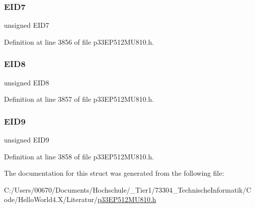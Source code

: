 \subsubsection{\texorpdfstring{E\+I\+D7}{EID7}}
{\footnotesize\ttfamily unsigned E\+I\+D7}



Definition at line 3856 of file p33\+E\+P512\+M\+U810.\+h.

\mbox{\label{structtag_c1_r_x_f2_e_i_d_b_i_t_s_acca25e0b7d86eb499d01f85222baea87}} 
\subsubsection{\texorpdfstring{E\+I\+D8}{EID8}}
{\footnotesize\ttfamily unsigned E\+I\+D8}



Definition at line 3857 of file p33\+E\+P512\+M\+U810.\+h.

\mbox{\label{structtag_c1_r_x_f2_e_i_d_b_i_t_s_ac6748f73d4ada8538b06548be4f396c2}} 
\subsubsection{\texorpdfstring{E\+I\+D9}{EID9}}
{\footnotesize\ttfamily unsigned E\+I\+D9}



Definition at line 3858 of file p33\+E\+P512\+M\+U810.\+h.



The documentation for this struct was generated from the following file\+:\begin{DoxyCompactItemize}
\item 
C\+:/\+Users/00670/\+Documents/\+Hochschule/\+\_\+\+Tier1/73304\+\_\+\+Technische\+Informatik/\+Code/\+Hello\+World4.\+X/\+Literatur/\hyperlink{p33_e_p512_m_u810_8h}{p33\+E\+P512\+M\+U810.\+h}\end{DoxyCompactItemize}
